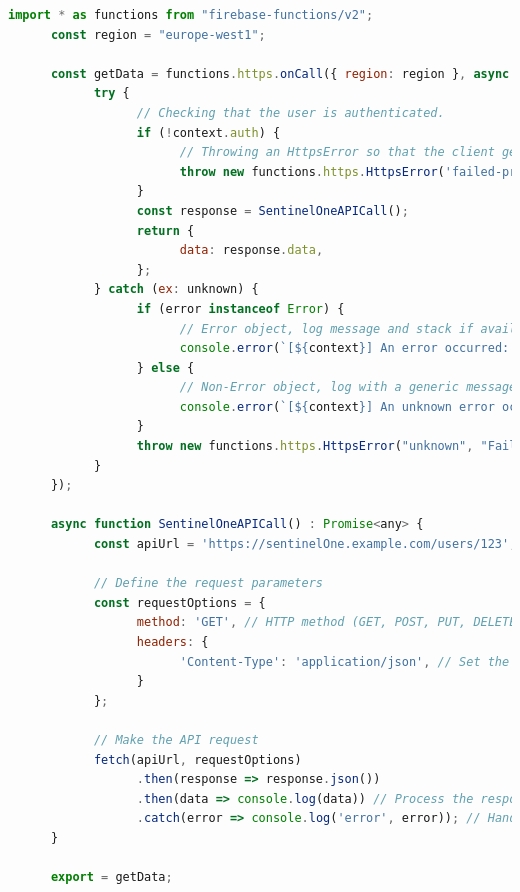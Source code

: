\begin{lstlisting}[language=JavaScript, caption=Example of onCall function with authentication check]
      import * as functions from "firebase-functions/v2";
      const region = "europe-west1";

      const getData = functions.https.onCall({ region: region }, async (request: CallableRequest<any>) => {
            try {
                  // Checking that the user is authenticated.
                  if (!context.auth) {
                        // Throwing an HttpsError so that the client gets the error details.
                        throw new functions.https.HttpsError('failed-precondition', 'The function must be called while authenticated.');
                  }
                  const response = SentinelOneAPICall();
                  return {
                        data: response.data,
                  };
            } catch (ex: unknown) {
                  if (error instanceof Error) {
                        // Error object, log message and stack if available
                        console.error(`[${context}] An error occurred: ${error.message} \n Stack: ${error.stack}`);
                  } else {
                        // Non-Error object, log with a generic message.
                        console.error(`[${context}] An unknown error occurred:`, error);
                  }
                  throw new functions.https.HttpsError("unknown", "Failed to retrieve agents", ex);
            }
      });

      async function SentinelOneAPICall() : Promise<any> {
            const apiUrl = 'https://sentinelOne.example.com/users/123';

            // Define the request parameters
            const requestOptions = {
                  method: 'GET', // HTTP method (GET, POST, PUT, DELETE, PATCH, etc.)
                  headers: {
                        'Content-Type': 'application/json', // Set the content type of the request
                  }
            };
      
            // Make the API request
            fetch(apiUrl, requestOptions)
                  .then(response => response.json())
                  .then(data => console.log(data)) // Process the response data
                  .catch(error => console.log('error', error)); // Handle any errors that occurred during the request
      }
              
      export = getData;
\end{lstlisting}


